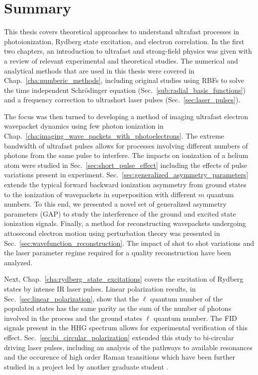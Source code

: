 \chapter{Summary} %
\label{cha:summary}

This thesis covers theoretical approaches to understand ultrafast processes in photoionization, Rydberg state excitation, and electron correlation.  In the first two chapters, an introduction to ultrafast and strong-field physics was given with a review of relevant experimental and theoretical studies. The numerical  and analytical methods that are used in this thesis were covered in Chap.~\ref{cha:numberic_methods}, including original studies using RBFs to solve the time independent Schr\"odinger equation (Sec.~\ref{sub:radial_basis_functions}) and a frequency correction to ultrashort laser pulses (Sec.~\ref{sec:laser_pulses}).

The focus was then turned to developing a method of imaging ultrafast electron wavepacket dynamics using few photon ionization in Chap.~\ref{cha:imaging_wave_packets_with_photoelectrons}. The extreme bandwidth of ultrafast pulses allows for processes involving different numbers of photons from the same pulse to interfere. The impacts on ionization of a helium atom were studied in Sec.~\ref{sec:short_pulse_effect} including the effects of pulse variations present in experiment. Sec.~\ref{sec:generalized_asymmetry_parameters} extends the typical forward backward ionization asymmetry from ground states to the ionization of wavepackets in superposition with different $m$ quantum numbers. To this end, we presented a novel set of generalized asymmetry parameters (GAP) to study the interference of the ground and excited state ionization signals. Finally, a method for reconstructing wavepackets undergoing attosecond electron motion using perturbation theory was presented in Sec.~\ref{sec:wavefunction_reconstruction}. The impact of shot to shot variations and the laser parameter regime required for a quality reconstruction have been analyzed.

Next, Chap.~\ref{cha:rydberg_state_excitations} covers the excitation of Rydberg states by intense IR laser pulses. Linear polarization results, in Sec.~\ref{sec:linear_polarization}, show that the $\ell$ quantum number of the populated states has the same parity as the sum of the number of photons involved in the process and the ground states $\ell$ quantum number. The FID signals present in the HHG spectrum allows for experimental verification of this effect. Sec.~\ref{sec:bi_circular_polarization} extended this study to bi-circular driving laser pulses, including an analysis of the pathways to available resonances and the occurence of high order Raman transitions which have been further studied in a project led by another graduate student \cite{gebre2021}.

